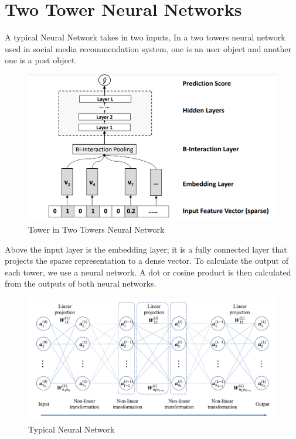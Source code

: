 \section{Two Tower Neural Networks} \label{nn}
A typical Neural Network takes in two inputs, In a two towers neural network used in social media recommendation system, one is an user object and another one is a post object.

\begin{figure}[H]
    \centering
    \includegraphics[width=1\linewidth]{Images/single-tower.png}
    \caption{Tower in Two Towers Neural Network \cite{10.1145/3038912.3052569}}
    \label{fig:collaborative-filtering-diagram}
\end{figure}

Above the input layer is the embedding layer; it is a fully
connected layer that projects the sparse representation to
a dense vector.  \cite{10.1145/3038912.3052569} \cite{DBLP:journals/corr/abs-1708-05027} To calculate the output of each tower, we use a neural network. A dot or cosine product is then calculated from the outputs of both neural networks.

\begin{figure}[H]
    \centering
    \includegraphics[width=1\linewidth]{Images/neural-network.png}
    \caption{Typical Neural Network \cite{GAO2020409}}
    \label{fig:collaborative-filtering-diagram}
\end{figure}

